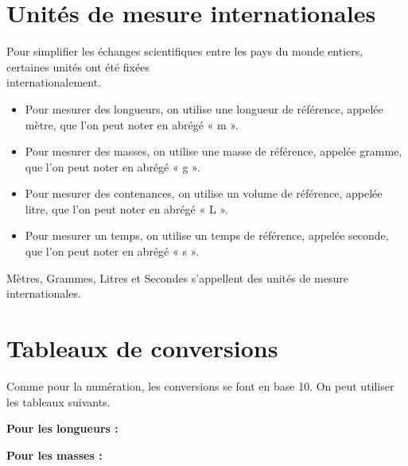 \documentclass[11pt]{article}
\renewcommand{\baselinestretch}{1} \setlength{\parindent}{0pt}
\begin{document}
\renewcommand{\baselinestretch}{1.5}

\section{Unités de mesure internationales}

\begin{remarque}
Pour simplifier les échanges scientifiques entre les pays du monde
entiers, certaines unités ont été fixées \\ internationalement.
\end{remarque}

\begin{definition}
\begin{itemize}
 \item Pour mesurer des longueurs, on utilise une longueur de référence, appelée mètre, que l’on peut noter en abrégé « m ».
\item Pour mesurer des masses, on utilise une masse de référence, appelée gramme, que l’on peut noter en abrégé « g ».
\item Pour mesurer des contenances, on utilise un volume de référence, appelée litre, que l’on peut noter en abrégé « L ».
\item Pour mesurer un temps, on utilise un temps de référence, appelée seconde, que l’on peut noter en abrégé « s ».
\end{itemize}
\end{definition}
\begin{vocabulaire}
Mètres, Grammes, Litres et Secondes s’appellent des unités de mesure internationales.
\end{vocabulaire}
  

\section{Tableaux de conversions}

\begin{remarque}
Comme pour la numération, les conversions se font en base 10. On 
peut utiliser les tableaux suivants.
\end{remarque}

\textbf{Pour les longueurs :}
\begin{center}
\end{center}

\textbf{Pour les masses :}
\begin{center}
\end{center}
\end{document}
